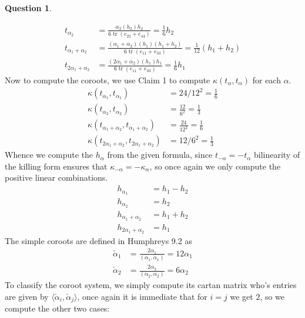 \documentclass[10.5pt]{article}
\theoremstyle{definition}
\newtheorem{pb}{Question}
\numberwithin{example}{subsection}
\numberwithin{proposition}{subsection}
\newcommand{\gen}[1]{\langle#1\rangle}
\begin{document}
\begin{pb}
\begin{enumerate}
\begin{align}
                t_{\alpha_2} &= \frac{\alpha_2(h_2)h_2}{6 \operatorname{tr}(e_{22} + e_{44})} = \frac16 h_2 \\
                t_{\alpha_1 + \alpha_2} &= \frac{(\alpha_1 + \alpha_2)(h_1)(h_1 + h_2)}{6 \operatorname{tr}(e_{11} + e_{33})} = \frac{1}{12}(h_1 + h_2) \\
                t_{2 \alpha_1 + \alpha_2} &= \frac{(2 \alpha_1 + \alpha_2)(h_1)h_1}{6 \operatorname{tr}(e_{11} + e_{33})} = \frac{1}{6}h_1
            \end{align}
            Now to compute the coroots, we use Claim 1 to compute \(\kappa(t_\alpha,t_\alpha)\) for each \(\alpha\).
            \begin{align}
                \kappa(t_{\alpha_1},t_{\alpha_1}) &= 24/12^2 = \frac16 \label{firstinnerprod} \\
                \kappa(t_{\alpha_2},t_{\alpha_2}) &= \frac{12}{6^2} = \frac13 \label{secondinnerprod} \\
                \kappa(t_{\alpha_1 + \alpha_2},t_{\alpha_1 + \alpha_2}) &= \frac{24}{12^2} = \frac16 \\
                \kappa(t_{2 \alpha_1 + \alpha_2},t_{2 \alpha_1 + \alpha_2}) &= 12/6^2 = \frac13
            \end{align}
            Whence we compute the \(h_\alpha\) from the given formula, since \(t_{-\alpha} = -t_\alpha\) bilinearity of the killing form ensures that \(\kappa_{-\alpha} = -\kappa_\alpha\), so once again we only compute the positive linear combinations.
            \begin{align}
                h_{\alpha_1} &= h_1 - h_2 \\
                h_{\alpha_2} &= h_2 \\
                h_{\alpha_1 + \alpha_2} &= h_1 + h_2 \\
                h_{2 \alpha_1 + \alpha_2} &= h_1
            \end{align}
            The simple coroots are defined in Humphreys 9.2 as
            \begin{align}
                \check{\alpha}_1 &= \frac{2 \alpha_1}{(\alpha_1,\alpha_1)} = 12 \alpha_1 \\
                \check{\alpha}_2 &= \frac{2 \alpha_2}{(\alpha_2,\alpha_2)} = 6 \alpha_2
            \end{align}
            To classify the coroot system, we simply compute its cartan matrix who's entries are given by \(\gen{\check{\alpha}_i,\check{\alpha}_j}\), once again it is immediate that for \(i = j\) we get \(2\), so we compute the other two cases:

\end{enumerate}
\end{pb}
\end{document}
